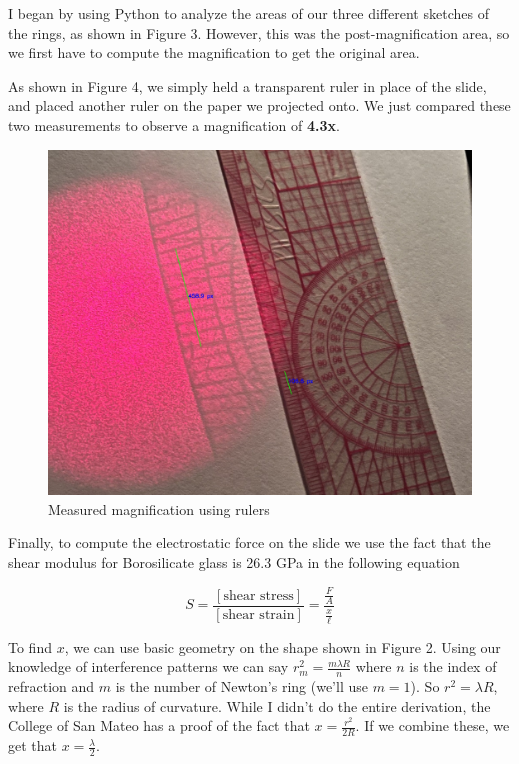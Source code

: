 \documentclass[12pt,letterpaper]{article}
\begin{document}
I began by using Python to analyze the areas of our three different sketches of the rings, as shown in Figure 3. However, this was the post-magnification area, so we first have to compute the magnification to get the original area.

As shown in Figure 4, we simply held a transparent ruler in place of the slide, and placed another ruler on the paper we projected onto. We just compared these two measurements to observe a magnification of \textbf{4.3x}.

\begin{figure}[ht]
    \centering
    \includegraphics[width=6in]{images/measured_lines.jpg}
    \caption{Measured magnification using rulers}
    \label{fig:setup}
\end{figure}

Finally, to compute the electrostatic force on the slide we use the fact that the shear modulus for Borosilicate glass is 26.3 GPa in the following equation

\begin{equation}
    S=\frac{[\text{shear stress}]}{[\text{shear strain}]}=\frac{\frac{F}{A}}{\frac{x}{\ell}}
\end{equation}

To find $x$, we can use basic geometry on the shape shown in Figure 2. Using our knowledge of interference patterns we can say $r_m^2=\frac{m\lambda R}{n}$ where $n$ is the index of refraction and $m$ is the number of Newton's ring (we'll use $m=1$). So $r^2=\lambda R$, where $R$ is the radius of curvature. While I didn't do the entire derivation, the College of San Mateo has a proof of the fact that $x=\frac{r^2}{2R}$. If we combine these, we get that $x=\frac{\lambda}{2}$.
\end{document}
